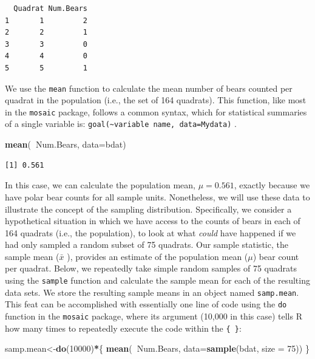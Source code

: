 \documentclass[fleqn,10pt]{wlpeerj} %
\newenvironment{Shaded}{\begin{snugshade}}{\end{snugshade}}
\newcommand{\DataTypeTok}[1]{\textcolor[rgb]{0.13,0.29,0.53}{#1}}
\newcommand{\DecValTok}[1]{\textcolor[rgb]{0.00,0.00,0.81}{#1}}
\newcommand{\KeywordTok}[1]{\textcolor[rgb]{0.13,0.29,0.53}{\textbf{#1}}}
\newcommand{\NormalTok}[1]{#1}
\newcommand{\OperatorTok}[1]{\textcolor[rgb]{0.81,0.36,0.00}{\textbf{#1}}}
\begin{document}
\begin{verbatim}
  Quadrat Num.Bears
1       1         2
2       2         1
3       3         0
4       4         0
5       5         1
\end{verbatim}

We use the \texttt{mean} function to calculate the mean number of bears counted per quadrat in the population (i.e., the set of 164 quadrats). This function, like most in the \texttt{mosaic} package, follows a common syntax, which for statistical summaries of a single variable is: \texttt{goal(\textasciitilde{}variable\ name,\ data=Mydata)} \citep{pruim2017mosaic}.

\begin{Shaded}
\begin{Highlighting}[]
\KeywordTok{mean}\NormalTok{(}\OperatorTok{~}\NormalTok{Num.Bears, }\DataTypeTok{data=}\NormalTok{bdat)}
\end{Highlighting}
\end{Shaded}

\begin{verbatim}
[1] 0.561
\end{verbatim}

In this case, we can calculate the population mean, \(\mu = 0.561\), exactly because we have polar bear counts for all sample units. Nonetheless, we will use these data to illustrate the concept of the sampling distribution. Specifically, we consider a hypothetical situation in which we have access to the counts of bears in each of 164 quadrats (i.e., the population), to look at what \emph{could} have happened if we had only sampled a random subset of 75 quadrats. Our sample statistic, the sample mean (\(\bar{x}\) ), provides an estimate of the population mean (\(\mu\)) bear count per quadrat. Below, we repeatedly take simple random samples of 75 quadrats using the \texttt{sample} function and calculate the sample mean for each of the resulting data sets. We store the resulting sample means in an object named \texttt{samp.mean}. This feat can be accomplished with essentially one line of code using the \texttt{do} function in the \texttt{mosaic} package, where its argument (10,000 in this case) tells R how many times to repeatedly execute the code within the \texttt{\{\ \}}:

\begin{Shaded}
\begin{Highlighting}[]
\NormalTok{samp.mean<-}\KeywordTok{do}\NormalTok{(}\DecValTok{10000}\NormalTok{)}\OperatorTok{*}\NormalTok{\{}
  \KeywordTok{mean}\NormalTok{(}\OperatorTok{~}\NormalTok{Num.Bears, }\DataTypeTok{data=}\KeywordTok{sample}\NormalTok{(bdat, }\DataTypeTok{size =} \DecValTok{75}\NormalTok{))}
\NormalTok{\}}
\end{Highlighting}
\end{Shaded}
\end{document}
